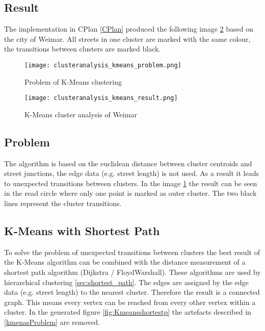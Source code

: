 \subsection{Result}
The implementation in CPlan \ref{CPlan} produced the following image \ref{fig:KmeansGenerated} based on the city of Weimar. All streets in one cluster are marked with the same colour, the transitions between clusters are marked black.

\begin{figure}
    \centering
    \begin{mdframed}[style=mdthight, userdefinedwidth=0.55\textwidth, align=center]
        \texttt{[image: clusteranalysis\_kmeans\_problem.png]}
    \end{mdframed}
    \caption{Problem of K-Means clustering
        \label{fig:KmeansProblem}}
\end{figure}

\begin{figure}
    \centering
    \begin{mdframed}[style=mdthight]
        \texttt{[image: clusteranalysis\_kmeans\_result.png]}
    \end{mdframed}
    \caption{K-Means cluster analysis of Weimar
    \label{fig:KmeansGenerated}}
\end{figure}

\subsection{Problem} \label{sec:kmenasProblem}
The algorithm is based on the euclidean distance between cluster centroids and street junctions, the edge data (e.g. street length) is not used. As a result it leads to unexpected transitions between clusters. In the image \ref{fig:KmeansProblem} the result can be seen in the read circle where only one point is marked as outer cluster. The two black lines represent the cluster transitions.

\subsection{K-Means with Shortest Path} \label{sec:K-Means_shortest_path}
To solve the problem of unexpected transitions between clusters the best result of the K-Means algorithm can be combined with the distance measurement of a shortest path algorithm (Dijkstra / FloydWarshall). These algorithms are used by hierarchical clustering \ref{sec:shortest_path}. The edges are assigned by the edge data (e.g. street length) to the nearest cluster. Therefore the result is a connected graph. This means every vertex can be reached from every other vertex within a cluster. In the generated figure \ref{fig:Kmeansshortestp} the artefacts described in \ref{kmenasProblem} are removed.

